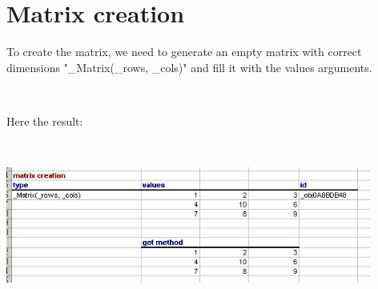 \section{Matrix creation}

To create the matrix, we need to generate an empty matrix with correct dimensions "\_Matrix(\_rows, \_cols)" and fill it with the values arguments. 

\ 

Here the result:

\

\includegraphics[width=12cm]{images/matrix2.jpg}
